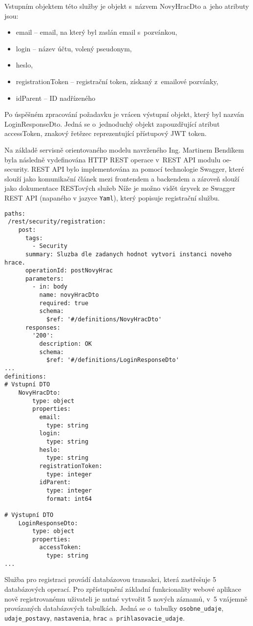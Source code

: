 \documentclass[12pt]{article}
\begin{document}
{Vstupním objektem této služby je objekt s~názvem NovyHracDto a~jeho atributy jsou:
\begin{itemize}
\item email -- email, na který byl zaslán email s~pozvánkou,
\item login -- název účtu, volený pseudonym,
\item heslo,
\item registrationToken -- registrační token, získaný z~emailové pozvánky,
\item idParent -- ID nadřízeného
\end{itemize}

Po úspěšném zpracování požadavku je vrácen výstupní objekt, 
který byl nazván LoginResponseDto.
Jedná se o~jednoduchý objekt zapouzdřující atribut accessToken, znakový řetězec reprezentující přístupový JWT token. 

Na základě servisně orientovaného modelu navrženého Ing. Martinem Bendíkem byla
následně vydefinována HTTP REST operace v~REST API modulu oe-security. 
REST API bylo implementována za pomocí technologie Swagger,
které slouží jako komunikační článek mezi frontendem a backendem
a zároveň slouží jako dokumentace RESTových služeb
Níže je možno vidět úryvek ze Swagger REST API (napaného v jazyce \texttt{Yaml}),
který popisuje registrační službu.

\clearpage

\begin{lstlisting}
paths:
 /rest/security/registration:
    post:
      tags:
        - Security
      summary: Sluzba dle zadanych hodnot vytvori instanci noveho hrace.
      operationId: postNovyHrac
      parameters:
        - in: body
          name: novyHracDto
          required: true
          schema:
            $ref: '#/definitions/NovyHracDto'
      responses:
        '200':
          description: OK
          schema:
            $ref: '#/definitions/LoginResponseDto'
...
definitions:
# Vstupní DTO
    NovyHracDto:
        type: object
        properties:
          email:
            type: string
          login:
            type: string
          heslo:
            type: string
          registrationToken:
            type: integer
          idParent:
            type: integer
            format: int64
        
# Výstupní DTO 
    LoginResponseDto:
        type: object
        properties:
          accessToken:
            type: string
...
\end{lstlisting}

Služba pro registraci provádí databázovou transakci,
která zastřešuje 5 databázových operací. 
Pro zpřístupnění základní funkcionality webové aplikace nově registrovanému uživateli je nutné vytvořit 5 nových záznamů,
v~5 vzájemně provázaných databázových tabulkách.
Jedná se o~tabulky \texttt{osobne\_udaje},
\texttt{udaje\_postavy}, \texttt{nastavenia}, \texttt{hrac} a~\texttt{prihlasovacie\_udaje}.

}
\end{document}
